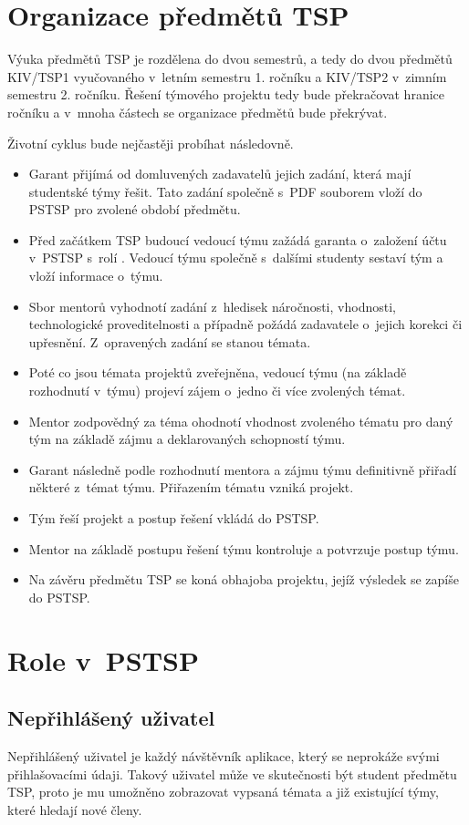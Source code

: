 \documentclass[czech,BP]{thesiskiv}
\begin{document}
\section{Organizace předmětů TSP}
	\par Výuka předmětů TSP je rozdělena do dvou semestrů, a tedy do dvou předmětů KIV/TSP1 vyučovaného v~letním semestru 1. ročníku a KIV/TSP2 v~zimním semestru 2. ročníku. Řešení týmového projektu tedy bude překračovat hranice ročníku a v~mnoha částech se organizace předmětů bude překrývat.
	\par Životní cyklus bude nejčastěji probíhat následovně. 
	\begin{itemize}
		\item Garant přijímá od domluvených zadavatelů jejich zadání, která mají studentské týmy řešit. Tato zadání společně s~PDF souborem vloží do PSTSP pro zvolené období předmětu.
		\item Před začátkem TSP budoucí vedoucí týmu zažádá garanta o~založení účtu v~PSTSP s~rolí . Vedoucí týmu společně s~dalšími studenty sestaví tým a vloží informace o~týmu.
		\item Sbor mentorů vyhodnotí zadání z~hledisek náročnosti, vhodnosti, technologické proveditelnosti a případně požádá zadavatele o~jejich korekci či upřesnění. Z~opravených zadání se stanou témata.
		\item Poté co jsou témata projektů zveřejněna, vedoucí týmu (na základě rozhodnutí v~týmu) projeví zájem o~jedno či více zvolených témat.
		\item Mentor zodpovědný za téma ohodnotí vhodnost zvoleného tématu pro daný tým na základě zájmu a deklarovaných schopností týmu.
		\item Garant následně podle rozhodnutí mentora a zájmu týmu definitivně přiřadí některé z~témat týmu. Přiřazením tématu vzniká projekt.
		\item Tým řeší projekt a postup řešení vkládá do PSTSP.
		\item Mentor na základě postupu řešení týmu kontroluje a potvrzuje postup týmu.
		\item Na závěru předmětu TSP se koná obhajoba projektu, jejíž výsledek se zapíše do PSTSP.
	\end{itemize}
\section{Role v~PSTSP}
	\subsection{Nepřihlášený uživatel}
		\par Nepřihlášený uživatel je každý návštěvník aplikace, který se neprokáže svými přihlašovacími údaji. Takový uživatel může ve skutečnosti být student předmětu TSP, proto je mu umožněno zobrazovat vypsaná témata a již existující týmy, které hledají nové členy.
\end{document}
